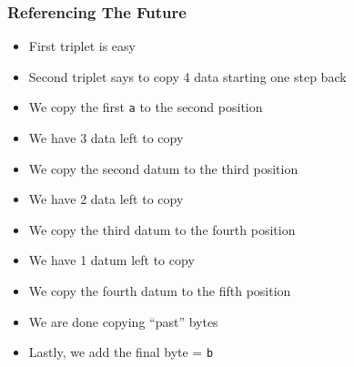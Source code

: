 \begin{frame}
  \frametitle{Referencing The Future}
  \begin{center}
       \hspace{2mm}   
  \end{center}
  \begin{overprint}
    \begin{itemize}
      \item First triplet is easy
    \end{itemize}

    \begin{itemize}
      \item Second triplet says to copy 4 data starting one step back
      \item We copy the first \texttt{a} to the second position
    \end{itemize}

    \begin{itemize}
      \item We have 3 data left to copy
      \item We copy the second datum to the third position
    \end{itemize}

    \begin{itemize}
      \item We have 2 data left to copy
      \item We copy the third datum to the fourth position
    \end{itemize}

    \begin{itemize}
      \item We have 1 datum left to copy
      \item We copy the fourth datum to the fifth position
    \end{itemize}

    \begin{itemize}
      \item We are done copying ``past'' bytes
    \end{itemize}

    \begin{itemize}
      \item Lastly, we add the final byte  = \texttt{b}
    \end{itemize}
  \end{overprint}
  \vskip4mm
  \begin{center}
\end{center}
\end{frame}
